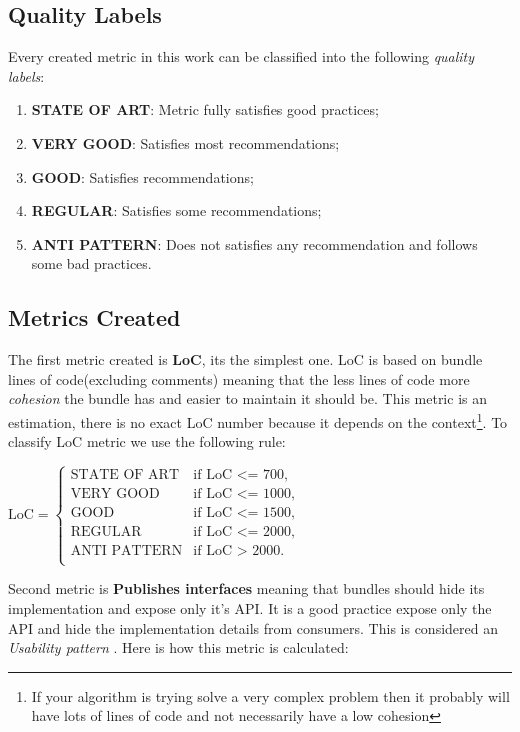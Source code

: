 \subsection{Quality Labels}
\label{sec:quality label}
Every created metric in this work can be classified into the following \emph{quality labels}:

\begin{enumerate}
\item \textbf{STATE OF ART}: Metric fully satisfies good practices;
\item \textbf{VERY GOOD}: Satisfies most recommendations;
\item \textbf{GOOD}: Satisfies recommendations;
\item \textbf{REGULAR}: Satisfies some recommendations;
\item \textbf{ANTI PATTERN}: Does not satisfies any recommendation and follows some bad practices.
\end{enumerate}


\subsection{Metrics Created}

The first metric created is \textbf{LoC}, its the simplest one. LoC is based on bundle lines of code(excluding comments) meaning that the less lines of code more \emph{cohesion} the bundle has and easier to maintain it should be. This metric is an estimation, there is no exact LoC number because it depends on the context\footnote{If your algorithm is trying solve a very complex problem then it probably will have lots of lines of code and not necessarily have a low cohesion}. To classify LoC metric we use the following rule:\newline


\(\text{LoC}=\begin{cases}
\text{STATE OF ART}& \text{if LoC <= 700},\\
\text{VERY GOOD}& \text{if LoC <= 1000}, \\
\text{GOOD}& \text{if LoC <= 1500}, \\
\text{REGULAR}& \text{if LoC <= 2000}, \\
\text{ANTI PATTERN}& \text{if LoC > 2000}. \\
\end{cases} \)\newline  

Second metric is \textbf{Publishes interfaces} meaning that bundles should hide its implementation and expose only it's API. It is a good practice expose only the API and hide the implementation details from consumers. This is considered an \emph{Usability pattern} \citep{Knoernschild 2012}. Here is how this metric is calculated:\newline

